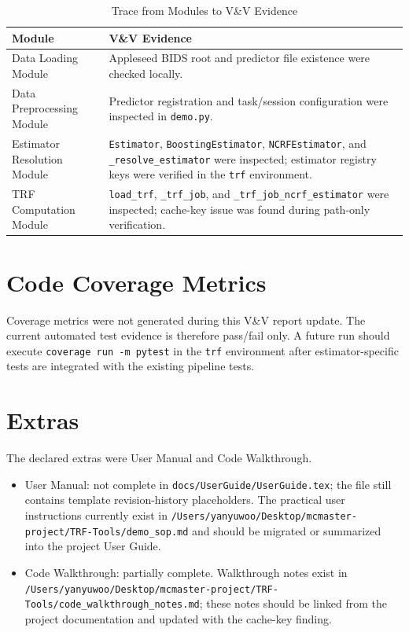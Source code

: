 \documentclass[12pt, titlepage]{article}
\begin{document}
\begin{table}[h!]
\centering
\begin{tabularx}{\textwidth}{p{}X}
\toprule
\textbf{Module} & \textbf{V\&V Evidence}\\
\midrule
Data Loading Module & Appleseed BIDS root and predictor file existence were checked locally.\\
Data Preprocessing Module & Predictor registration and task/session configuration were inspected in \texttt{demo.py}.\\
Estimator Resolution Module & \texttt{Estimator}, \texttt{BoostingEstimator}, \texttt{NCRFEstimator}, and \texttt{\_resolve\_estimator} were inspected; estimator registry keys were verified in the \texttt{trf} environment.\\
TRF Computation Module & \texttt{load\_trf}, \texttt{\_trf\_job}, and \texttt{\_trf\_job\_ncrf\_estimator} were inspected; cache-key issue was found during path-only verification.\\
\bottomrule
\end{tabularx}
\caption{Trace from Modules to V\&V Evidence}
\label{tab:module-trace}
\end{table}

\section{Code Coverage Metrics}

Coverage metrics were not generated during this V\&V report update. The current automated test evidence is therefore pass/fail only. A future run should execute \texttt{coverage run -m pytest} in the \texttt{trf} environment after estimator-specific tests are integrated with the existing pipeline tests.

\section{Extras}


The declared extras were User Manual and Code Walkthrough.

\begin{itemize}
  \item User Manual: not complete in \texttt{docs/UserGuide/UserGuide.tex}; the file still contains template revision-history placeholders. The practical user instructions currently exist in \texttt{/Users/yanyuwoo/Desktop/mcmaster-project/TRF-Tools/demo\_sop.md} and should be migrated or summarized into the project User Guide.
  \item Code Walkthrough: partially complete. Walkthrough notes exist in \texttt{/Users/yanyuwoo/Desktop/mcmaster-project/TRF-Tools/code\_walkthrough\_notes.md}; these notes should be linked from the project documentation and updated with the cache-key finding.
\end{itemize}
\end{document}
